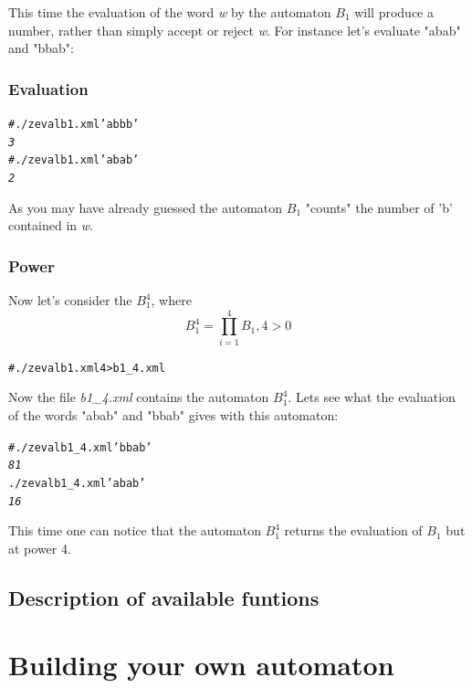 This time the evaluation of the word \textit{w} by the automaton $B_1$
will produce a number, rather than simply accept or reject \textit{w}.
For instance let's evaluate "abab" and "bbab":

\subsubsection{Evaluation}

\begin{alltt}
# ./z eval b1.xml 'abbb'
\textit{3}
# ./z eval b1.xml 'abab'
\textit{2}
\end{alltt}

As you may have already guessed the automaton $B_1$ "counts" the
number of 'b' contained in \textit{w}.

\subsubsection{Power}

Now let's consider the $B_1^4$, where
$$B_1^4 = \prod_{i=1}^4 B_1, 4 > 0$$

\begin{alltt}
# ./z eval b1.xml 4 > b1_4.xml
\end{alltt}

Now the file \textit{b1\_4.xml} contains the automaton $B_1^4$. Lets
see what the evaluation of the words "abab" and "bbab" gives with this
automaton:

\begin{alltt}
#./z eval b1_4.xml 'bbab'
\textit{81}
./z eval b1_4.xml 'abab'
\textit{16}
\end{alltt}

This time one can notice that the automaton $B_1^4$ returns the
evaluation of $B_1$ but at power 4.

\subsection{Description of available funtions}


\section{Building your own automaton}
